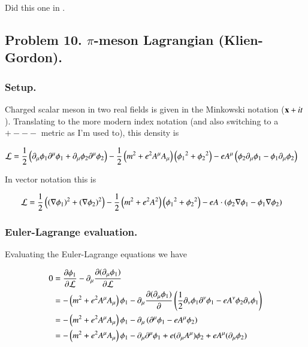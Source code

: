\documentclass{article}
\begin{document}
Did this one in \cite{PJgoldch1}.

\subsection{ Problem 10.  $\pi$-meson Lagrangian (Klien-Gordon). }

\subsubsection{ Setup. }

Charged scalar meson in two real fields is given in the Minkowski notation ($\mathbf{x} + it$).  Translating to the more modern index notation (and also switching
to a $+---$ metric as I'm used to), this density is

\begin{align*}
\mathcal{L} 
&=
\frac{1}{2}\left( 
\partial_\mu \phi_1 \partial^\mu \phi_1
+\partial_\mu \phi_2 \partial^\mu \phi_2
\right)
- \frac{1}{2} \left( m^2 + e^2 A^\mu A_\mu \right) \left( {\phi_1}^2 + {\phi_2}^2 \right)
- e A^\mu \left( 
\phi_2 \partial_\mu \phi_1 - \phi_1 \partial_\mu \phi_2  
\right) 
\end{align*}

In vector notation this is

\begin{align*}
\mathcal{L} 
&=
\frac{1}{2}\left( (\nabla \phi_1)^2 + (\nabla \phi_2)^2 \right)
- \frac{1}{2} \left( m^2 + e^2 A^2 \right) \left( {\phi_1}^2 + {\phi_2}^2 \right)
- e A \cdot \left( \phi_2 \nabla \phi_1 - \phi_1 \nabla \phi_2  \right) 
\end{align*}

\subsubsection{ Euler-Lagrange evaluation. }

Evaluating the Euler-Lagrange equations we have

\begin{align*}
0 
&= 
\frac{\partial{\phi_1}}{\partial {\mathcal{L}}}
- \partial_\mu \frac{\partial{(\partial_\mu \phi_1)}}{\partial {\mathcal{L}}} \\
&= 
- \left( m^2 + e^2 A^\mu A_\mu \right) \phi_1
- \partial_\mu \frac{\partial{(\partial_\mu \phi_1)}}{\partial {}} 
\left(
\frac{1}{2} \partial_\nu \phi_1 \partial^\nu \phi_1 - e A^\nu \phi_2 \partial_\nu \phi_1 
\right) \\
&= 
- \left( m^2 + e^2 A^\mu A_\mu \right) \phi_1 - \partial_\mu \left( \partial^\mu \phi_1 - e A^\mu \phi_2 \right) \\
&= 
- \left( m^2 + e^2 A^\mu A_\mu \right) \phi_1 - \partial_\mu \partial^\mu \phi_1 
+ e (\partial_\mu A^\mu) \phi_2 
+ e A^\mu (\partial_\mu \phi_2)
\end{align*}
\end{document}
